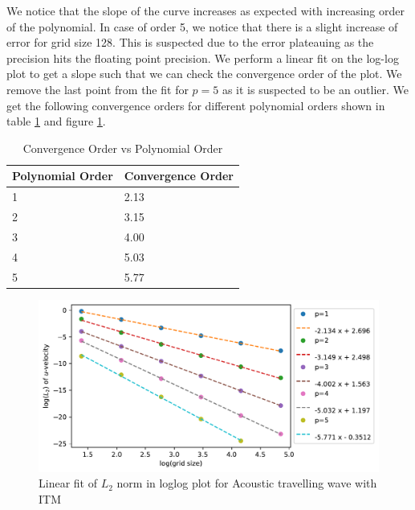 We notice that the slope of the curve increases as expected with increasing order of the polynomial. In case of order 5, we notice that there is a slight increase
of error for grid size 128. This is suspected due to the error plateauing as the precision hits the floating point precision. We perform a linear fit on the log-log
plot to get a slope such that we can check the convergence order of the plot. We remove the last point from the fit for $p=5$ as it is suspected to be an outlier. 
We get the following convergence orders for different polynomial orders shown in table \ref{table:convergenceorder} and figure \ref{fig:convergenceorder}.

\begin{center}
\begin{table}[]
    \centering
    \begin{tabular}{|l|l|}
        \hline
     \textbf{Polynomial Order}& \textbf{Convergence Order}  \\
     \hline
     1 & 2.13\\
     \hline
     2 & 3.15 \\
     \hline
     3 & 4.00 \\
     \hline
     4 & 5.03 \\
        \hline
        5 & 5.77\\
        \hline
    \end{tabular}
    \caption{Convergence Order vs Polynomial Order}
    \label{table:convergenceorder}
    \end{table}
\end{center}

\begin{figure}
    \centering
    \includegraphics[width=\linewidth]{figures/error2.pdf}
    \caption{Linear fit of $L_2$ norm in loglog plot for Acoustic travelling wave with \ac{ITM}}
    \label{fig:convergenceorder}
\end{figure}

